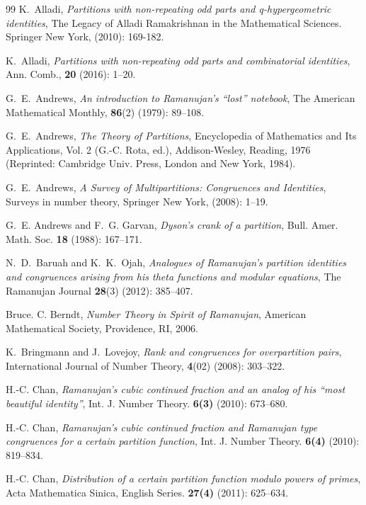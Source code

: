 \documentclass[12pt]{amsart}
\numberwithin{equation}{section}
\theoremstyle{plain}
\theoremstyle{definition}
\begin{document}
\begin{thebibliography}{99}
K.~Alladi, \emph{Partitions with non-repeating odd parts and q-hypergeometric identities}, The Legacy of Alladi Ramakrishnan in the Mathematical Sciences. Springer New York, (2010): 169-182.

K.~Alladi, \emph{Partitions with non-repeating odd parts and combinatorial identities}, Ann. Comb., \textbf{20} (2016): 1--20.

G.~E.~Andrews, \emph{An introduction to Ramanujan's ``lost'' notebook}, The American Mathematical Monthly, {\bf 86}(2) (1979): 89--108.

G.~E.~Andrews, \emph{The Theory of Partitions}, Encyclopedia of Mathematics and Its Applications, Vol. 2 (G.-C. Rota, ed.), Addison-Wesley, Reading, 1976 (Reprinted: Cambridge Univ. Press, London and New York, 1984).

G.~E.~Andrews, \emph{A Survey of Multipartitions: Congruences and Identities}, Surveys in number theory, Springer New York, (2008): 1--19.



G.~E. Andrews and F.~G. Garvan, \emph{Dyson's crank of a partition}, Bull. Amer. Math. Soc. {\bf 18} (1988): 167--171.

N.~D.~Baruah and K.~K.~Ojah, \emph{Analogues of Ramanujan's partition identities and congruences arising from his theta functions and modular equations}, The Ramanujan Journal {\bf 28}(3) (2012): 385--407.



Bruce. C. Berndt, \emph{Number Theory in Spirit of Ramanujan}, American Mathematical Society, Providence, RI, 2006.

K.~Bringmann and J.~Lovejoy, \emph{Rank and congruences for overpartition pairs}, International Journal of Number Theory, {\bf 4}(02) (2008): 303--322.

H.-C. Chan, \emph{Ramanujan's cubic continued fraction and an analog of his ``most beautiful identity''}, Int. J. Number Theory. \textbf{6(3)} (2010): 673--680.

H.-C. Chan, \emph{Ramanujan's cubic continued fraction and Ramanujan type congruences for a certain partition function}, Int. J. Number Theory. \textbf{6(4)} (2010): 819--834.

H.-C. Chan, \emph{Distribution of a certain partition function modulo powers of primes}, Acta Mathematica Sinica, English Series. \textbf{27(4)} (2011): 625--634.


\end{thebibliography}
\end{document}

